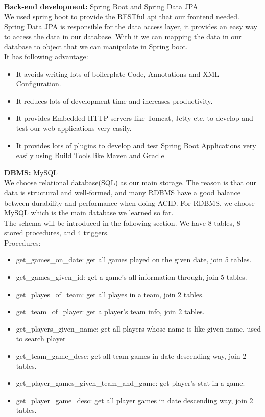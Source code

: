\documentclass[a4paper,12pt]{article} %
\begin{document}
\textbf{Back-end development:} Spring Boot and Spring Data JPA\\[5pt]
We used spring boot to provide the RESTful api that our frontend needed. Spring Data JPA is responsible 
for the data access layer, it provides an easy way to access the data in our database. With it we can mapping the 
data in our database to object that we can manipulate in Spring boot.\\[5pt]
It has following advantage:
\begin{itemize}
    \item It avoids writing lots of boilerplate Code, Annotations and XML Configuration.
    \item It reduces lots of development time and increases productivity.
    \item It provides Embedded HTTP servers like Tomcat, Jetty etc. to develop and test our web applications very easily.
    \item It provides lots of plugins to develop and test Spring Boot Applications very easily using Build Tools like Maven and Gradle
\end{itemize}
\textbf{DBMS:} MySQL\\[5pt]
We choose relational database(SQL) as our main storage. The reason is that our data is structural and 
well-formed, and many RDBMS have a good balance between durability and performance when doing ACID. 
For RDBMS, we choose MySQL which is the main database we learned so far. \\[5pt]
The schema will be introduced in the following section. We have 8 tables, 8 stored procedures, and 4 triggers.\\[5pt]
Procedures:
\begin{itemize}
    \item get\_games\_on\_date: get all games played on the given date, join 5 tables.
    \item get\_games\_given\_id: get a game's all information through, join 5 tables.
    \item get\_playes\_of\_team: get all playes in a team, join 2 tables.
    \item get\_team\_of\_player: get a player's team info, join 2 tables.
    \item get\_players\_given\_name: get all players whose name is like given name, used to search player
    \item get\_team\_game\_desc: get all team games in date descending way, join 2 tables.
    \item get\_player\_games\_given\_team\_and\_game: get player's stat in a game.
    \item get\_player\_game\_desc: get all player games in date descending way, join 2 tables.
\end{itemize}
\end{document}
